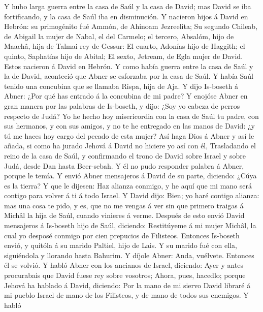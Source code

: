  Y hubo larga guerra entre la casa de Saúl y la casa de
David; mas David se iba fortificando, y la casa de Saúl iba en
disminución.  Y nacieron hijos á David en Hebrón: su
primogénito fué Ammón, de Ahinoam Jezreelita;  Su segundo
Chileab, de Abigail la mujer de Nabal, el del Carmelo; el tercero,
Absalóm, hijo de Maachâ, hija de Talmai rey de Gessur:  El
cuarto, Adonías hijo de Haggith; el quinto, Saphatías hijo de Abital;
 El sexto, Jetream, de Egla mujer de David. Estos nacieron
á David en Hebrón.  Y como había guerra entre la casa de
Saúl y la de David, aconteció que Abner se esforzaba por la casa de
Saúl.  Y había Saúl tenido una concubina que se llamaba
Rispa, hija de Aja. Y dijo Is-boseth á Abner: ¿Por qué has entrado á la
concubina de mi padre?  Y enojóse Abner en gran manera por
las palabras de Is-boseth, y dijo: ¿Soy yo cabeza de perros respecto de
Judá? Yo he hecho hoy misericordia con la casa de Saúl tu padre, con sus
hermanos, y con sus amigos, y no te he entregado en las manos de David:
¿y tú me haces hoy cargo del pecado de esta mujer?  Así
haga Dios á Abner y así le añada, si como ha jurado Jehová á David no
hiciere yo así con él,  Trasladando el reino de la casa
de Saúl, y confirmando el trono de David sobre Israel y sobre Judá,
desde Dan hasta Beer-sebah.  Y él no pudo responder
palabra á Abner, porque le temía.  Y envió Abner
mensajeros á David de su parte, diciendo: ¿Cúya es la tierra? Y que le
dijesen: Haz alianza conmigo, y he aquí que mi mano será contigo para
volver á ti á todo Israel.  Y David dijo: Bien; yo haré
contigo alianza: mas una cosa te pido, y es, que no me vengas á ver sin
que primero traigas á Michâl la hija de Saúl, cuando vinieres á verme.
 Después de esto envió David mensajeros á Is-boseth hijo
de Saúl, diciendo: Restitúyeme á mi mujer Michâl, la cual yo desposé
conmigo por cien prepucios de Filisteos.  Entonces
Is-boseth envió, y quitóla á su marido Paltiel, hijo de Lais.
 Y su marido fué con ella, siguiéndola y llorando hasta
Bahurim. Y díjole Abner: Anda, vuélvete. Entonces él se volvió.
 Y habló Abner con los ancianos de Israel, diciendo: Ayer
y antes procurabais que David fuese rey sobre vosotros; 
Ahora, pues, hacedlo; porque Jehová ha hablado á David, diciendo: Por la
mano de mi siervo David libraré á mi pueblo Israel de mano de los
Filisteos, y de mano de todos sus enemigos.  Y habló
